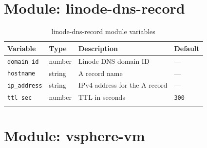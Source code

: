 \documentclass[12pt,a4paper,twoside]{report}
\newcommand{\code}[1]{\texttt{#1}}
\begin{document}
\section{Module: linode-dns-record}

\begin{longtable}{@{}L{4.2cm}lL{5.3cm}l@{}}
  \toprule
  \textbf{Variable} & \textbf{Type} & \textbf{Description} & \textbf{Default} \\
  \midrule
  \endhead
  \code{domain\_id}    & number & Linode DNS domain ID                & — \\
  \code{hostname}      & string & A record name                       & — \\
  \code{ip\_address}   & string & IPv4 address for the A record       & — \\
  \code{ttl\_sec}      & number & TTL in seconds                      & \code{300} \\
  \bottomrule
  \caption{linode-dns-record module variables}
\end{longtable}

\section{Module: vsphere-vm}
\end{document}
